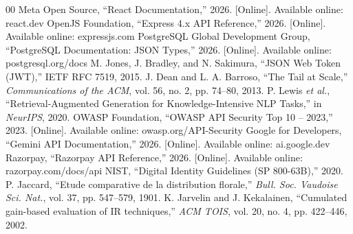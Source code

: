 \documentclass[conference]{IEEEtran}
\begin{document}
\begin{thebibliography}{00}
 Meta Open Source, ``React Documentation,'' 2026. [Online]. Available online: react.dev
 OpenJS Foundation, ``Express 4.x API Reference,'' 2026. [Online]. Available online: expressjs.com
 PostgreSQL Global Development Group, ``PostgreSQL Documentation: JSON Types,'' 2026. [Online]. Available online: postgresql.org/docs
 M. Jones, J. Bradley, and N. Sakimura, ``JSON Web Token (JWT),'' IETF RFC 7519, 2015.
 J. Dean and L. A. Barroso, ``The Tail at Scale,'' \textit{Communications of the ACM}, vol. 56, no. 2, pp. 74--80, 2013.
 P. Lewis \textit{et al.}, ``Retrieval-Augmented Generation for Knowledge-Intensive NLP Tasks,'' in \textit{NeurIPS}, 2020.
 OWASP Foundation, ``OWASP API Security Top 10 -- 2023,'' 2023. [Online]. Available online: owasp.org/API-Security
 Google for Developers, ``Gemini API Documentation,'' 2026. [Online]. Available online: ai.google.dev
 Razorpay, ``Razorpay API Reference,'' 2026. [Online]. Available online: razorpay.com/docs/api
 NIST, ``Digital Identity Guidelines (SP 800-63B),'' 2020.
 P. Jaccard, ``Etude comparative de la distribution florale,'' \textit{Bull. Soc. Vaudoise Sci. Nat.}, vol. 37, pp. 547--579, 1901.
 K. Jarvelin and J. Kekalainen, ``Cumulated gain-based evaluation of IR techniques,'' \textit{ACM TOIS}, vol. 20, no. 4, pp. 422--446, 2002.
\end{thebibliography}
\end{document}
